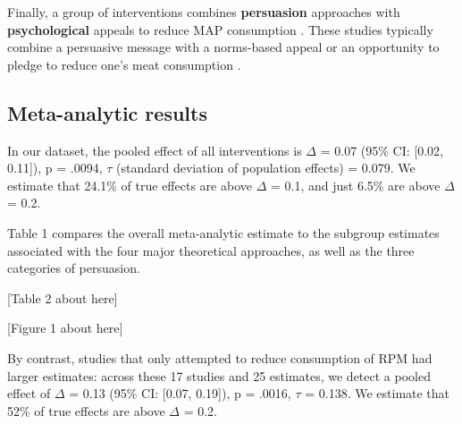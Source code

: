 \documentclass[sn-nature,referee,pdflatex]{sn-jnl}
\begin{document}
\begin{comment}
Norms might be descriptive, stating how many people engaged in the desired behavior [@aldoh2023], or dynamic, telling subjects that the number of people reducing their MAP consumption is increasing over time [@aldoh2023; @coker2022; @sparkman2020].
Another study looked at response inhibition training, where subjects are trained to associate meat with an inhibiting response [@camp2019].
The first psychology study meeting our inclusion criteria was published in 2017.
\end{comment}

Finally, a group of interventions combines \textbf{persuasion}
approaches with \textbf{psychological} appeals to reduce MAP consumption
\citep{berndsen2005, bertolaso2015, carfora2023, fehrenbach2015, hennessy2016, mathur2021effectiveness, mattson2020, piester2020, shreedhar2021}.
These studies typically combine a persuasive message with a norms-based
appeal \citep{piester2020, mattson2020} or an opportunity to pledge to
reduce one's meat consumption
\citep{mathur2021effectiveness, shreedhar2021}.

\subsection{Meta-analytic results}\label{sec2.3}

In our dataset, the pooled effect of all interventions is \(\Delta\) =
0.07 (95\% CI: {[}0.02, 0.11{]}), p = .0094, \(\tau\) (standard
deviation of population effects) = 0.079. We estimate that 24.1\% of
true effects are above \(\Delta\) = 0.1, and just 6.5\% are above
\(\Delta\) = 0.2.

Table 1 compares the overall meta-analytic estimate to the subgroup
estimates associated with the four major theoretical approaches, as well
as the three categories of persuasion.

\begin{center}
[Table 2 about here]
\end{center}
\begin{center}
[Figure 1 about here]
\end{center}

By contrast, studies that only attempted to reduce consumption of RPM
had larger estimates: across these 17 studies and 25 estimates, we
detect a pooled effect of \(\Delta\) = 0.13 (95\% CI: {[}0.07, 0.19{]}),
p = .0016, \(\tau\) = 0.138. We estimate that 52\% of true effects are
above \(\Delta\) = 0.2.
\end{document}
